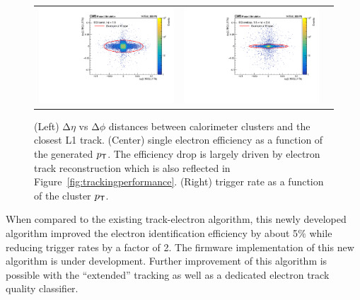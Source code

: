  \begin{figure}[tbh!]
 \begin{center}
  \begin{tabular}{ccc}
   \includegraphics[width=.45\linewidth]{figures/Part2/Upgrade/DR_barrel}&
   \includegraphics[width=.45\linewidth]{figures/Part2/Upgrade/DR_endcap}&
  \end{tabular}
  \caption{(Left) $\mathrm{\Delta}\eta$ vs $\mathrm{\Delta}\phi$ distances between calorimeter clusters and the closest L1 track. (Center) single electron efficiency as a function of the generated $p_{\textsf{T}}$. The efficiency drop is largely driven by electron track reconstruction which is also reflected in Figure~\ref{fig:trackingperformance}. (Right) trigger rate as a function of the cluster $p_{\textsf{T}}$.}
 \label{fig:electron}
 \end{center}
\end{figure}

When compared to the existing track-electron algorithm, this newly developed algorithm improved the electron identification efficiency by about 5$\%$ while reducing trigger rates by a factor of 2. The firmware implementation of this new algorithm is under development. Further improvement of this algorithm is possible with the ``extended'' tracking as well as a dedicated electron track quality classifier.

